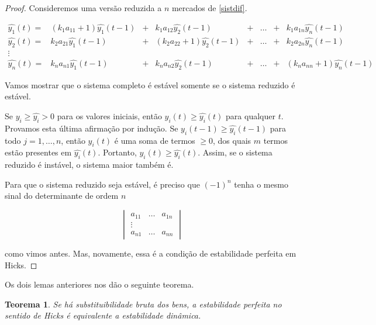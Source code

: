 \documentclass[
	12pt,				%
	openright,			%
	twoside,			%
	a4paper,			%
	english,			%
	french,				%
	spanish,			%
	brazil				%
	]{abntex2}
\newtheorem{teorema}{Teorema}[chapter]
\begin{document}
\begin{proof}
	Consideremos uma versão reduzida a $n$ mercados de \ref{sistdif}.

	\begin{equation} \label{sistdifreduz}
		\begin{matrix}
				\hat{y_1}(t) =& (k_1a_{11} + 1)\hat{y_1}(t - 1) &+& k_1a_{12}\hat{y_2}(t-1) &+& \ldots &+& k_1a_{1n}\hat{y_n}(t-1) \\
				\hat{y_2}(t) =& k_2a_{21}\hat{y_1}(t - 1) &+& (k_2a_{22} + 1)\hat{y_2}(t-1) &+& \ldots &+& k_2a_{2n}\hat{y_n}(t-1) \\
				\vdots \\
				\hat{y_n}(t) =& k_na_{n1}\hat{y_1}(t - 1) &+& k_na_{n2}\hat{y_2}(t-1) &+& \ldots &+& (k_na_{nn} + 1)\hat{y_n}(t-1)
		\end{matrix}
	\end{equation}

	Vamos mostrar que o sistema completo é estável somente se o sistema reduzido é estável.

	Se $y_i \geq \hat{y_i} > 0$ para os valores iniciais, então
	$y_i(t) \geq \hat{y_i}(t)$ para qualquer $t$. Provamos esta última afirmação por
	indução. Se $y_i(t-1) \geq \hat{y_i}(t-1)$ para todo $j = 1, \ldots, n$, então
	$y_i(t)$ é uma soma de termos $\geq 0$, dos quais $m$ termos estão presentes em
	$\hat{y_i}(t)$. Portanto, $y_i(t) \geq \hat{y_i}(t)$. Assim, se o sistema reduzido
	é instável, o sistema maior também é.

	Para que o sistema reduzido seja estável, é preciso que $(-1)^n$ tenha o mesmo sinal do
	determinante de ordem $n$

\begin{equation}
	\begin{vmatrix}
		a_{11} & \ldots & a_{1n} \\
		\vdots \\
		a_{n1} & \ldots & a_{nn}
	\end{vmatrix}
\end{equation}

	como vimos antes. Mas, novamente, essa é a condição de estabilidade perfeita em Hicks.

\end{proof}

Os dois lemas anteriores nos dão o seguinte teorema.

\begin{teorema}
	Se há substituibilidade bruta dos bens, a estabilidade perfeita no sentido de Hicks
	é equivalente a estabilidade dinâmica.
\end{teorema}
\end{document}
